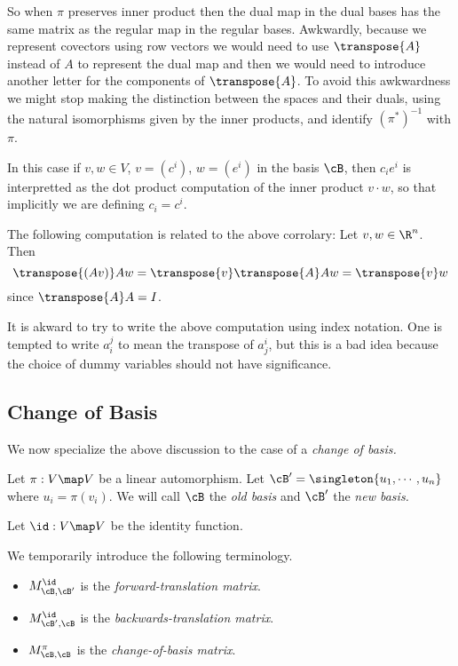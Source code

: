 \documentclass[oneside,12pt]{amsart}
\begin{document}
\begin{note}
So when $\pi$ preserves inner product then
the dual map in the dual bases has the same matrix as the
regular map in the regular bases.
Awkwardly, because we represent covectors using row vectors we would
need to use $\transpose{A}$ instead of $A$ to represent the dual map
and then we would need to introduce another letter for the
components of $\transpose{A}$.
To avoid this awkwardness we might stop making the distinction between
the spaces and their duals, using the natural isomorphisms given by
the inner products, and identify $(\pi^*)^{-1}$ with $\pi$.


In this case if $v,w \in V$, $v=(c^i)$, $w=(e^i)$ in the basis $\cB$,
then 
$c_i e^i$ is interpretted as the dot product computation of the inner product $v \cdot w $,
so that implicitly we are defining $c_i = c^i$.

The following computation is related to the above corrolary: Let $v,w\in\R^n$. Then
$$\transpose{(Av)}Aw = \transpose{v}\transpose{A}Aw = \transpose{v}w$$
since $\transpose{A}A = I$.

It is akward to try to write the above computation using index notation. One is
tempted to write $a^j_i$ to mean the transpose of $a^i_j$, but this is a bad
idea because the choice of dummy variables should not have significance.

\end{note}

\subsection{Change of Basis}

We now specialize the above discussion to the case of a \emph{change of basis.}

Let $\pi: V \map V$ be a linear automorphism. Let $\cB^{\prime} = \singleton{u_1,\cdots,u_n}$
where $u_i = \pi(v_i)$. We will call $\cB$ the \emph{old basis} and $\cB^{\prime}$ the
\emph{new basis.}

Let $\id:V\map V$ be the identity function.

\begin{definition}
We temporarily introduce the following terminology.

\begin{itemize}
\item $M^{\id}_{\cB,\cB^{\prime}}$ is the \emph{forward-translation matrix}.
\item $M^{\id}_{\cB^{\prime},\cB}$ is the \emph{backwards-translation matrix}.
\item $M^{\pi}_{\cB,\cB}$ is the \emph{change-of-basis matrix}.
\end{itemize}
\end{definition}
\end{document}
